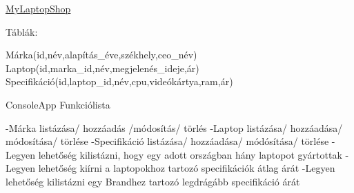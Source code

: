 \mbox{\hyperlink{namespace_my_laptop_shop}{My\+Laptop\+Shop}}

Táblák\+:

Márka(id,név,alapítás\+\_\+éve,székhely,ceo\+\_\+név) Laptop(id,marka\+\_\+id,név,megjelenés\+\_\+ideje,ár) Specifikáció(id,laptop\+\_\+id,név,cpu,videókártya,ram,ár)

Console\+App Funkciólista

-\/Márka listázása/ hozzáadás /módosítás/ törlés -\/Laptop listázása/ hozzáadása/ módosítása/ törlése -\/Specifikáció listázása/ hozzáadása/ módósítása/ törlése -\/Legyen lehetőség kilistázni, hogy egy adott országban hány laptopot gyártottak -\/Legyen lehetőség kiírni a laptopokhoz tartozó specifikációk átlag árát -\/Legyen lehetőség kilistázni egy Brandhez tartozó legdrágább specifikáció árát 
